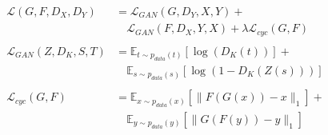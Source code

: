 \begin{equation}
    \label{eq:cycle_gan_loss}
    \begin{aligned}
        \mathcal{L}(G,F,D_X,D_Y) &= \mathcal{L}_{GAN}(G,D_Y,X,Y) + \\
        &\quad \mathcal{L}_{GAN}(F,D_X,Y,X) + \lambda\mathcal{L}_{cyc}(G,F) 
        \\ \\
        \mathcal{L}_{GAN}(Z,D_{K},S,T) &= \mathbb{E}_{t \sim p_{data}(t)}\left[ \log(D_K(t)) \right] + \\
        &\quad \mathbb{E}_{s \sim p_{data}(s)}\left[ \log(1 - D_K(Z(s))) \right]    
        \\ \\
        \mathcal{L}_{cyc}(G,F) &= \mathbb{E}_{x \sim p_{data}(x)}\left[ \|F(G(x)) - x\|_{1} \right] +  \\
        &\quad \mathbb{E}_{y \sim p_{data}(y)}\left[ \|G(F(y)) - y\|_{1} \right]
        \end{aligned}
\end{equation}

